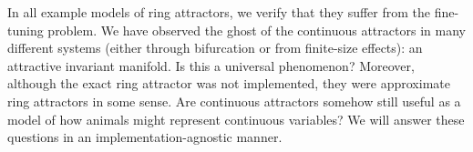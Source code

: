 \documentclass{article} %
\newcommand{\mpcomment}[1]{\textcolor{mpcolor}{(#1)}}
\newcounter{ct}
\theoremstyle{definition}
\theoremstyle{remark}
\begin{document}
In all example models of ring attractors, we verify that they suffer from the fine-tuning problem.
We have observed the ghost of the continuous attractors in many different systems (either through bifurcation or from finite-size effects): an attractive invariant manifold.
Is this a universal phenomenon?
Moreover, although the exact ring attractor was not implemented, they were approximate ring attractors in some sense.
Are continuous attractors somehow still useful as a model of how animals might represent continuous variables?
We will answer these questions in an implementation-agnostic manner.



\end{document}
